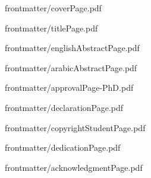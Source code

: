\documentclass[12pt, a4paper, oneside]{memoir}
\begin{document}
\frontmatter

\pagestyle{plain}


%


{frontmatter/coverPage.pdf}

\setcounter{page}{1}

{frontmatter/titlePage.pdf}


{frontmatter/englishAbstractPage.pdf}


{frontmatter/arabicAbstractPage.pdf}


{frontmatter/approvalPage-PhD.pdf}


{frontmatter/declarationPage.pdf}


%
%

{frontmatter/copyrightStudentPage.pdf}



{frontmatter/dedicationPage.pdf}


{frontmatter/acknowledgmentPage.pdf}

\tableofcontents*
\newpage
\listoftables
\newpage
\listoffigures

\mainmatter
\DoubleSpacing


\backmatter
%
\printbibliography[title={REFERENCES}]
\end{document}
